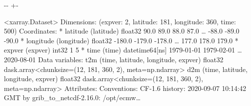 \documentclass[letterpaper,10pt,english]{sphinxmanual}
\newlength\nbsphinxcodecellspacing
\begin{document}
{
\begin{sphinxVerbatim}[commandchars=\\\{\}]
\llap{\color{nbsphinxin}[10]:\,\hspace{\fboxrule}\hspace{\fboxsep}}   
\end{sphinxVerbatim}
}

{

\kern-\sphinxverbatimsmallskipamount\kern-\baselineskip
\kern+\FrameHeightAdjust\kern-\fboxrule
\vspace{\nbsphinxcodecellspacing}

\begin{sphinxVerbatim}[commandchars=\\\{\}]
\llap{\color{nbsphinxout}[10]:\,\hspace{\fboxrule}\hspace{\fboxsep}}<xarray.Dataset>
Dimensions:    (expver: 2, latitude: 181, longitude: 360, time: 500)
Coordinates:
  * latitude   (latitude) float32 90.0 89.0 88.0 87.0 {\ldots} -88.0 -89.0 -90.0
  * longitude  (longitude) float32 -180.0 -179.0 -178.0 {\ldots} 177.0 178.0 179.0
  * expver     (expver) int32 1 5
  * time       (time) datetime64[ns] 1979-01-01 1979-02-01 {\ldots} 2020-08-01
Data variables:
    t2m        (time, latitude, longitude, expver) float32 dask.array<chunksize=(12, 181, 360, 2), meta=np.ndarray>
    d2m        (time, latitude, longitude, expver) float32 dask.array<chunksize=(12, 181, 360, 2), meta=np.ndarray>
Attributes:
    Conventions:  CF-1.6
    history:      2020-09-07 10:14:42 GMT by grib\_to\_netcdf-2.16.0: /opt/ecmw{\ldots}
\end{sphinxVerbatim}
}

{
\begin{sphinxVerbatim}[commandchars=\\\{\}]
\llap{\color{nbsphinxin}[14]:\,\hspace{\fboxrule}\hspace{\fboxsep}} 
\end{sphinxVerbatim}
}
\end{document}
